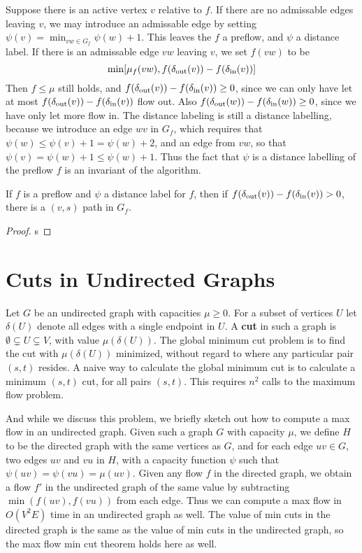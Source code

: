 Suppose there is an active vertex $v$ relative to $f$. If there are no admissable edges leaving $v$, we may introduce an admissable edge by setting $\psi(v) = \min_{vw \in G_f} \psi(w) + 1$. This leaves the $f$ a preflow, and $\psi$ a distance label. If there is an admissable edge $vw$ leaving $v$, we set $f(vw)$ to be
%
\[ \min[ \mu_f(vw), f(\operatorname{\delta_{\text{out}}}(v)) - f(\operatorname{\delta_{\text{in}}}(v))] \]
%
Then $f \leq \mu$ still holds, and $f(\operatorname{\delta_{\text{out}}}(v)) - f(\operatorname{\delta_{\text{in}}}(v)) \geq 0$, since we can only have let at most $f(\operatorname{\delta_{\text{out}}}(v)) - f(\operatorname{\delta_{\text{in}}}(v))$ flow out. Also $f(\operatorname{\delta_{\text{out}}}(w)) - f(\operatorname{\delta_{\text{in}}}(w)) \geq 0$, since we have only let more flow in. The distance labeling is still a distance labelling, because we introduce an edge $wv$ in $G_f$, which requires that $\psi(w) \leq \psi(v) + 1 = \psi(w) + 2$, and an edge from $vw$, so that $\psi(v) = \psi(w) + 1 \leq \psi(w) + 1$. Thus the fact that $\psi$ is a distance labelling of the preflow $f$ is an invariant of the algorithm.

\begin{lemma}
    If $f$ is a preflow and $\psi$ a distance label for $f$, then if $f(\operatorname{\delta_{\text{out}}}(v)) - f(\operatorname{\delta_{\text{in}}}(v)) > 0$, there is a $(v,s)$ path in $G_f$.
\end{lemma}
\begin{proof}
    s
\end{proof}

\section{Cuts in Undirected Graphs}

Let $G$ be an undirected graph with capacities $\mu \geq 0$. For a subset of vertices $U$ let $\delta(U)$ denote all edges with a single endpoint in $U$. A {\bf cut} in such a graph is $\emptyset \subsetneq U \subsetneq V$, with value $\mu(\delta(U))$. The global minimum cut problem is to find the cut with $\mu(\delta(U))$ minimized, without regard to where any particular pair $(s,t)$ resides. A naive way to calculate the global minimum cut is to calculate a minimum $(s,t)$ cut, for all pairs $(s,t)$. This requires $n^2$ calls to the maximum flow problem.

And while we discuss this problem, we briefly sketch out how to compute a max flow in an undirected graph. Given such a graph $G$ with capacity $\mu$, we define $H$ to be the directed graph with the same vertices as $G$, and for each edge $uv \in G$, two edges $uv$ and $vu$ in $H$, with a capacity function $\psi$ such that $\psi(uv) = \psi(vu) = \mu(uv)$. Given any flow $f$ in the directed graph, we obtain a flow $f'$ in the undirected graph of the same value by subtracting $\min(f(uv), f(vu))$ from each edge. Thus we can compute a max flow in $O(V^2E)$ time in an undirected graph as well. The value of min cuts in the directed graph is the same as the value of min cuts in the undirected graph, so the max flow min cut theorem holds here as well.


